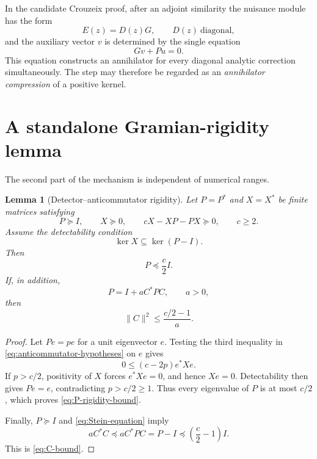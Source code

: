 \documentclass[11pt]{article}
\newtheorem{lemma}[theorem]{Lemma}
\begin{document}
In the candidate Crouzeix proof, after an adjoint similarity the
nuisance module has the form
\begin{equation}
 E(z)=D(z)G,
 \qquad D(z)\ \text{diagonal},
 \label{eq:diagonal-nuisance}
\end{equation}
and the auxiliary vector $v$ is determined by the single equation
\begin{equation}
 Gv+Pu=0.
 \label{eq:annihilator-equation}
\end{equation}
This equation constructs an annihilator for every diagonal analytic
correction simultaneously.  The step may therefore be regarded as an
\emph{annihilator compression} of a positive kernel.

\section{A standalone Gramian-rigidity lemma}

The second part of the mechanism is independent of numerical ranges.

\begin{lemma}[Detector--anticommutator rigidity]
\label{lem:detector-anticommutator}
Let $P=P^*$ and $X=X^*$ be finite matrices satisfying
\begin{equation}
 P\succeq I,
 \qquad X\succeq0,
 \qquad cX-XP-PX\succeq0,
 \qquad c\geq2.
 \label{eq:anticommutator-hypotheses}
\end{equation}
Assume the detectability condition
\begin{equation}
 \ker X\subseteq\ker(P-I).
 \label{eq:detectability}
\end{equation}
Then
\begin{equation}
 P\preceq\frac c2 I.
 \label{eq:P-rigidity-bound}
\end{equation}
If, in addition,
\begin{equation}
 P=I+aC^*PC,
 \qquad a>0,
 \label{eq:Stein-equation}
\end{equation}
then
\begin{equation}
 \|C\|^2\leq\frac{c/2-1}{a}.
 \label{eq:C-bound}
\end{equation}
\end{lemma}

\begin{proof}
Let $Pe=pe$ for a unit eigenvector $e$.  Testing the third
inequality in \eqref{eq:anticommutator-hypotheses} on $e$ gives
\begin{equation}
 0\leq(c-2p)e^*Xe.
 \label{eq:eigenvector-test}
\end{equation}
If $p>c/2$, positivity of $X$ forces $e^*Xe=0$, and hence
$Xe=0$.  Detectability then gives $Pe=e$, contradicting
$p>c/2\geq1$.  Thus every eigenvalue of $P$ is at most $c/2$,
which proves \eqref{eq:P-rigidity-bound}.

Finally, $P\succeq I$ and \eqref{eq:Stein-equation} imply
\[
 aC^*C\preceq aC^*PC=P-I
 \preceq\left(\frac c2-1\right)I.
\]
This is \eqref{eq:C-bound}.
\end{proof}
\end{document}

